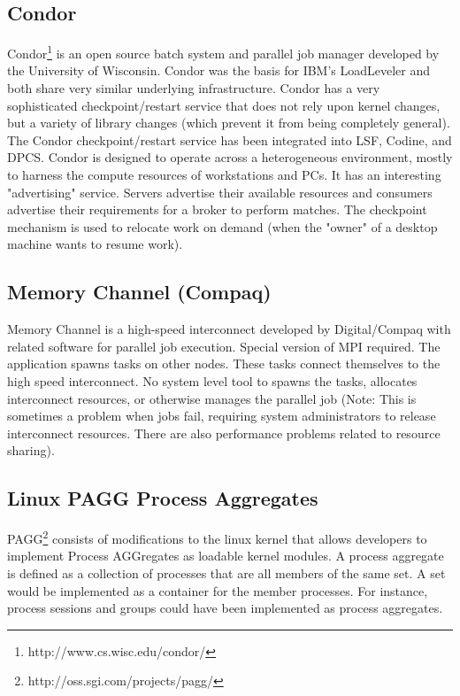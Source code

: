 \subsection{Condor}


Condor\footnote{http://www.cs.wisc.edu/condor/}
 is an open source batch system and parallel job manager 
developed by the University of Wisconsin. Condor was the basis for 
IBM's LoadLeveler and both share very similar underlying 
infrastructure. Condor has a very sophisticated checkpoint/restart 
service that does not rely upon kernel changes, but a variety of 
library changes (which prevent it from being completely general). The 
Condor checkpoint/restart service has been integrated into LSF, 
Codine, and DPCS. Condor is designed to operate across a 
heterogeneous environment, mostly to harness the compute resources of 
workstations and PCs. It has an interesting "advertising" service. 
Servers advertise their available resources and consumers advertise 
their requirements for a broker to perform matches. The checkpoint 
mechanism is used to relocate work on demand (when the "owner" of a 
desktop machine wants to resume work).



\subsection{Memory Channel (Compaq)}

Memory Channel is a high-speed interconnect developed by 
Digital/Compaq with related software for parallel job execution. 
Special version of MPI required. The application spawns tasks on 
other nodes. These tasks connect themselves to the high speed 
interconnect. No system level tool to spawns the tasks, allocates 
interconnect resources, or otherwise manages the parallel job (Note: 
This is sometimes a problem when jobs fail, requiring system 
administrators to release interconnect resources. There are also 
performance problems related to resource sharing).

\subsection{Linux PAGG Process Aggregates}


PAGG\footnote{http://oss.sgi.com/projects/pagg/}
consists of modifications to the linux kernel that allows
developers to implement Process AGGregates as loadable kernel modules.
A process aggregate is defined as a collection of processes that are
all members of the same set. A set would be implemented as a container
for the member processes. For instance, process sessions and groups
could have been implemented as process aggregates.


